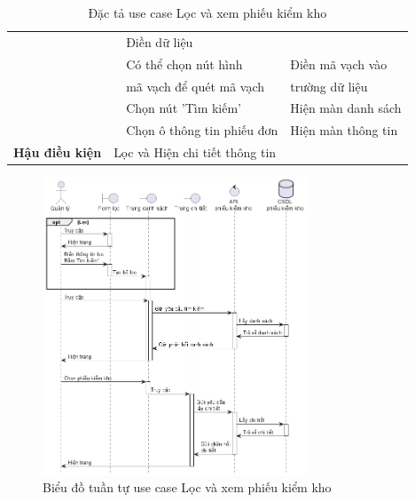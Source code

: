 \documentclass[../DoAn.tex]{subfiles}
\begin{document}
\begin{table}[H]
\begin{tabular}{|l|c|l|l|}
                                                &                                                                                 & Điền dữ liệu                            &                                                 \\
                                                &                                                                                 & Có thể chọn nút hình                    & Điền mã vạch vào                                \\
                                                &                                                                                 & mã vạch để quét mã vạch                 & trường dữ liệu                                  \\ \cline{3-4}
                                                &                                                                                 & Chọn nút 'Tìm kiếm'                     & Hiện màn danh sách                              \\ \cline{3-4}
                                                &                                                                                 & Chọn ô thông tin phiếu đơn              & Hiện màn thông tin                              \\ \hline
        \textbf{Hậu điều kiện}                  & \multicolumn{3}{l|}{Lọc và Hiện chi tiết thông tin}                                                                                                                         \\ \hline
    \end{tabular}
    \caption{Đặc tả use case Lọc và xem phiếu kiểm kho}
    \label{table:uc-auditreport-filter}
\end{table}
\begin{figure}[H]
    \centering
    \includegraphics[width=0.7\textwidth]{Hinhve/sequences/AuditReportFilter.png}
    \caption{Biểu đồ tuần tự use case Lọc và xem phiếu kiểm kho}
    \label{figure:sd-auditreport-filter}
\end{figure}
\break
\end{document}
